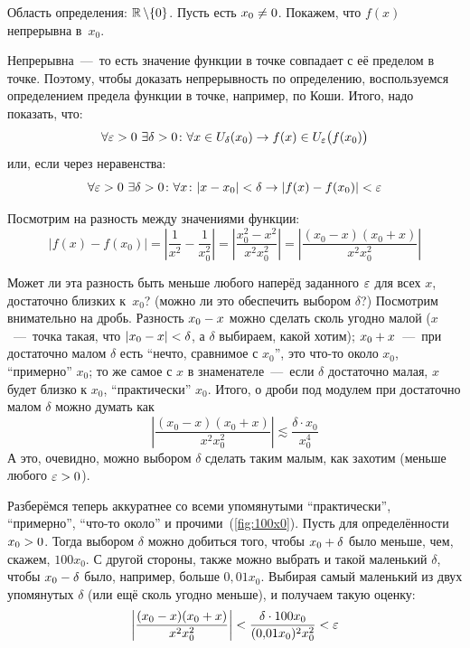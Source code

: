 \documentclass[a4paper,12pt]{article}
\begin{document}
  \begin{solution}
    Область определения: $\RR \hm\setminus \{0\}$.
    Пусть есть $x_0 \hm{\not=} 0$.
    Покажем, что $f(x)$ непрерывна в~$x_0$.
    
    Непрерывна~---~то есть значение функции в точке совпадает с её пределом в точке.
    Поэтому, чтобы доказать непрерывность по определению, воспользуемся определением предела функции в точке, например, по Коши.
    Итого, надо показать, что:
    \[
      \forall \varepsilon > 0\ \exists \delta > 0\colon \forall x \in U_{\delta}(x_0) \to f(x) \in U_{\varepsilon}\bigl(f(x_0)\bigr)
    \]
    или, если через неравенства:
    \[
      \forall \varepsilon > 0\ \exists \delta > 0\colon \forall x\colon |x - x_0| < \delta \to |f(x) - f(x_0)| < \varepsilon
    \]

    Посмотрим на разность между значениями функции:
    \[
      |f(x) - f(x_0)| = \left|\frac{1}{x^2} - \frac{1}{x_0^2}\right|
        = \left|\frac{x_0^2 - x^2}{x^2 x_0^2}\right|
        = \left|\frac{(x_0 - x)(x_0 + x)}{x^2 x_0^2}\right|
    \]

    Может ли эта разность быть меньше любого наперёд заданного $\varepsilon$ для всех $x$, достаточно близких к~$x_0$? (можно ли это обеспечить выбором $\delta$?)
    Посмотрим внимательно на дробь.
    Разность $x_0 \hm- x$ можно сделать сколь угодно малой ($x$~---~точка такая, что $|x_0 \hm- x| \hm< \delta$, а $\delta$ выбираем, какой хотим);
    $x_0 \hm+ x$~---~при достаточно малом $\delta$ есть ``нечто, сравнимое с $x_0$'', это что-то около $x_0$, ``примерно'' $x_0$;
    то же самое с $x$ в знаменателе~---~если $\delta$ достаточно малая, $x$ будет близко к $x_0$, ``практически'' $x_0$.
    Итого, о дроби под модулем при достаточно малом $\delta$ можно думать как
    \[
      \left|\frac{(x_0 - x)(x_0 + x)}{x^2 x_0^2}\right| \lesssim \frac{\delta \cdot x_0}{x_0^4}
    \]
    А это, очевидно, можно выбором $\delta$ сделать таким малым, как захотим (меньше любого $\eps \hm> 0$).

    Разберёмся теперь аккуратнее со всеми упомянутыми ``практически'', ``примерно'', ``что-то около'' и прочими~(\ref{fig:100x0}).
    Пусть для определённости $x_0 \hm> 0$.
    Тогда выбором $\delta$ можно добиться того, чтобы $x_0 \hm+ \delta$ было меньше, чем, скажем, $100 x_0$.
    С другой стороны, также можно выбрать и такой маленький $\delta$, чтобы $x_0 \hm- \delta$ было, например, больше $0{,}01 x_0$.
    Выбирая самый маленький из двух упомянутых $\delta$ (или ещё сколь угодно меньше), и получаем такую оценку:
    \[
      \left|\frac{(x_0 - x)(x_0 + x)}{x^2 x_0^2}\right| < \frac{\delta \cdot 100 x_0}{(0{,}01 x_0)^2 x_0^2} < \varepsilon
    \]
    

\end{solution}
\end{document}
